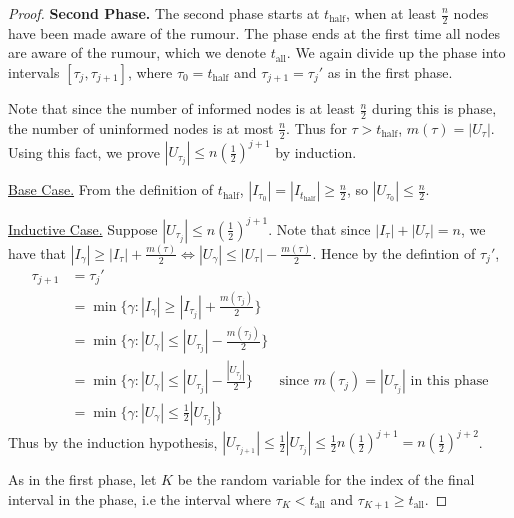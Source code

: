 \begin{proof}


	\textbf{Second Phase.} The second phase starts at $t_\text{half}$, when at least $\frac{n}{2}$ nodes have been made aware of the rumour. The phase ends at the first time all nodes are aware of the rumour, which we denote $t_\text{all}$. We again divide up the phase into intervals $[\tau_j, \tau_{j+1}]$, where $\tau_0 = t_\text{half}$ and $\tau_{j+1} = \tau_j'$ as in the first phase.

	Note that since the number of informed nodes is at least $\frac{n}{2}$ during this is phase, the number of uninformed nodes is at most $\frac{n}{2}$. Thus for $\tau > t_\text{half}$, $m(\tau) = |U_\tau|$. Using this fact, we prove $|U_{\tau_j}| \leq n(\frac{1}{2})^{j+1}$ by induction.

	\underline{Base Case.}
	From the definition of $t_\text{half}$, $|I_{\tau_0}| = |I_{t_\text{half}}| \geq \frac{n}{2}$, so $|U_{\tau_0}| \leq \frac{n}{2}$.

	\underline{Inductive Case.} Suppose $|U_{\tau_j}| \leq n(\frac{1}{2})^{j+1}$. Note that since $|I_\tau| + |U_\tau| = n$, we have that $|I_{\gamma}| \geq |I_\tau| + \frac{m(\tau)}{2} \iff |U_\gamma| \leq |U_\tau| - \frac{m(\tau)}{2}$. Hence by the defintion of $\tau_j'$,
	\begin{align*}
		\tau_{j+1} &= \tau_j' \\
		&= \min \{ \gamma : |I_\gamma| \geq |I_{\tau_j}| + \frac{m(\tau_j)}{2}\} \\
		&= \min \{ \gamma : |U_\gamma| \leq |U_{\tau_j}| - \frac{m(\tau_j)}{2}\} \\
		&= \min \{ \gamma : |U_\gamma| \leq |U_{\tau_j}| - \frac{|U_{\tau_j}|}{2}\} & \text{since } m(\tau_j) = |U_{\tau_j}| \text{ in this phase} \\
		&= \min \{ \gamma : |U_\gamma| \leq \frac{1}{2}|U_{\tau_j}|\}
	\end{align*}
	Thus by the induction hypothesis, $|U_{\tau_{j+1}}| \leq \frac{1}{2}|U_{\tau_j}| \leq \frac{1}{2}n(\frac{1}{2})^{j+1} = n(\frac{1}{2})^{j+2}$.

	As in the first phase, let $K$ be the random variable for the index of the final interval in the phase, i.e the interval where $\tau_K < t_\text{all}$ and $\tau_{K+1} \geq t_\text{all}$.


\end{proof}
